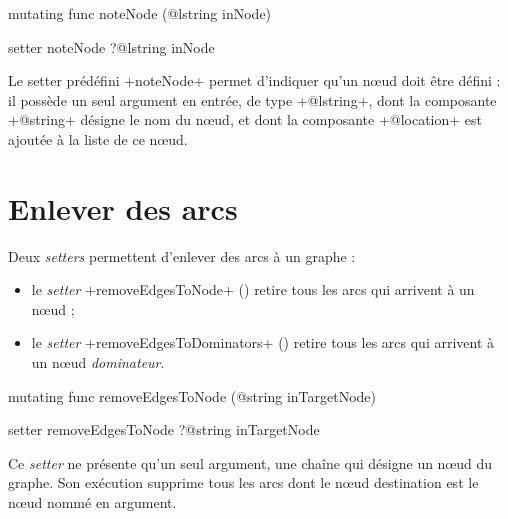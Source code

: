 
\begin{galgas4}
mutating func noteNode (@lstring inNode)
\end{galgas4}

\begin{galgas4}
setter noteNode ?@lstring inNode
\end{galgas4}

Le setter prédéfini \ggsq+noteNode+ permet d'indiquer qu'un nœud doit être défini : il possède un seul argument en entrée, de type \ggsq+@lstring+, dont la composante \ggsq+@string+ désigne le nom du nœud, et dont la composante \ggsq+@location+ est ajoutée à la liste de ce nœud.



\section{Enlever des arcs}

Deux \emph{setters} permettent d'enlever des arcs à un graphe :
\begin{itemize}
  \item le \emph{setter} \ggsq+removeEdgesToNode+ () retire tous les arcs qui arrivent à un nœud ;
  \item le \emph{setter} \ggsq+removeEdgesToDominators+ () retire tous les arcs qui arrivent à un nœud \emph{dominateur}.
\end{itemize}




\begin{galgas4}
mutating func removeEdgesToNode (@string inTargetNode)
\end{galgas4}

\begin{galgas4}
setter removeEdgesToNode ?@string inTargetNode
\end{galgas4}

Ce \emph{setter} ne présente qu'un seul argument, une chaîne qui désigne un nœud du graphe. Son exécution supprime tous les arcs dont le nœud destination est le nœud nommé en argument.


